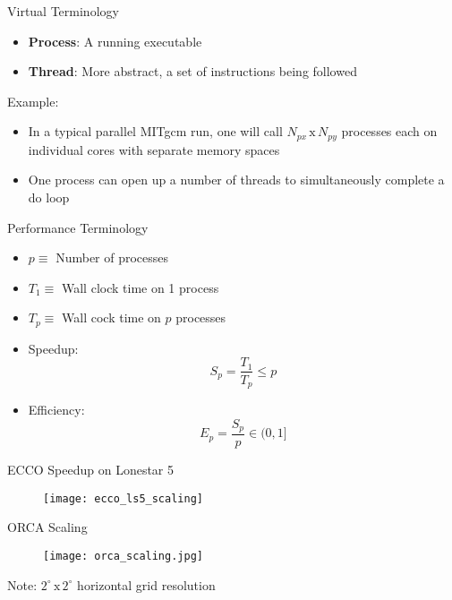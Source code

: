 \documentclass[pdf]{beamer}
\begin{document}
 \begin{frame}{Virtual Terminology}
  \begin{itemize}
	\item \textbf{Process}: A running executable
	\item \textbf{Thread}: More abstract, a set of instructions being followed
  \end{itemize} 	
  
  Example: 
  \begin{itemize}
	\item In a typical parallel MITgcm run, one will call $N_{px}\, \mathrm{x}\, N_{py}$ processes each on individual cores with separate memory spaces
	\item One process can open up a number of threads to simultaneously complete a do loop 
  \end{itemize}
 \end{frame} 

 \begin{frame}{Performance Terminology}
  \begin{itemize}
	\item $p \equiv $ Number of processes
	\item $T_1 \equiv $ Wall clock time on 1 process
	\item $T_p \equiv $ Wall cock time on $p$ processes
	\item Speedup: 
	 \begin{equation}
		S_p = \frac{T_1}{T_p} \leq p
	 \end{equation}
	\item Efficiency: 
	 \begin{equation}
		E_p = \frac{S_p}{p} \in (0,1]
	 \end{equation}
  \end{itemize}
 \end{frame}

 \begin{frame}{ECCO Speedup on Lonestar 5}
	\begin{figure}
	\centering
	\texttt{[image: ecco\_ls5\_scaling]}
	\end{figure}
 \end{frame}

 \begin{frame}{ORCA Scaling}
	\begin{figure}
	\centering
	\texttt{[image: orca\_scaling.jpg]}
	\end{figure}
	Note: $2^{\circ}\,\mathrm{x}\,2^{\circ}$ horizontal grid resolution
 \end{frame}
\end{document}
